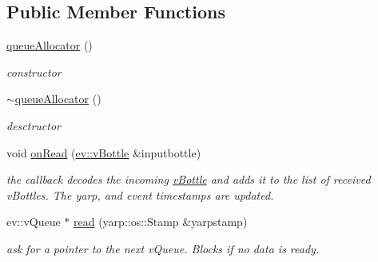 \subsection*{Public Member Functions}
\begin{DoxyCompactItemize}
\item 
\mbox{\label{classev_1_1queueAllocator_aecc5317205f3d9d5d753dfefcb2d3228}} 
\hyperlink{classev_1_1queueAllocator_aecc5317205f3d9d5d753dfefcb2d3228}{queue\+Allocator} ()
\begin{DoxyCompactList}\small\item\em constructor \end{DoxyCompactList}\item 
\mbox{\label{classev_1_1queueAllocator_a30954e25aa82ffd21aa513987a36bb40}} 
\hyperlink{classev_1_1queueAllocator_a30954e25aa82ffd21aa513987a36bb40}{$\sim$queue\+Allocator} ()
\begin{DoxyCompactList}\small\item\em desctructor \end{DoxyCompactList}\item 
\mbox{\label{classev_1_1queueAllocator_a12ae388a8d2deb71ca5b927c3eb0a860}} 
void \hyperlink{classev_1_1queueAllocator_a12ae388a8d2deb71ca5b927c3eb0a860}{on\+Read} (\hyperlink{classev_1_1vBottle}{ev\+::v\+Bottle} \&inputbottle)
\begin{DoxyCompactList}\small\item\em the callback decodes the incoming \hyperlink{classev_1_1vBottle}{v\+Bottle} and adds it to the list of received v\+Bottles. The yarp, and event timestamps are updated. \end{DoxyCompactList}\item 
\mbox{\label{classev_1_1queueAllocator_aa7d2e90c0cb859b798da083eb01b486a}} 
ev\+::v\+Queue $\ast$ \hyperlink{classev_1_1queueAllocator_aa7d2e90c0cb859b798da083eb01b486a}{read} (yarp\+::os\+::\+Stamp \&yarpstamp)
\begin{DoxyCompactList}\small\item\em ask for a pointer to the next v\+Queue. Blocks if no data is ready. \end{DoxyCompactList}\item 
\mbox{\label{classev_1_1queueAllocator_a1a914bc39f534dc50a7eb2ba846753bf}} 

\end{DoxyCompactItemize}
